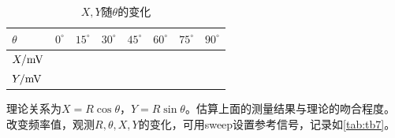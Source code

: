 \documentclass[11pt,a4paper]{ctexart}
\begin{document}
\begin{table}[H]
\centering

\begin{tabular}{|p{15mm}|p{15mm}|p{15mm}|p{15mm}|p{15mm}|p{15mm}|p{15mm}|p{15mm}|}
\hline
$\theta$ & $0^\circ$ & $15^\circ$ & $30^\circ$ & $45^\circ$ & $60^\circ$ & $75^\circ$ & $90^\circ$ \\ \hline
$X/{\rm mV}$ &  &  &  &  &  &  &  \\ \hline
$Y/{\rm mV}$ &  &  &  &  &  &  &  \\ \hline
\end{tabular}

\caption{$X,Y$随$\theta$的变化\label{tab:tb6}}
\end{table}
理论关系为$X= R\cos \theta$，$Y = R\sin \theta$。估算上面的测量结果与理论的吻合程度\uline{\hspace{4cm}}。改变频率值，观测$R,\theta ,X,Y$的变化，可用sweep设置参考信号，记录如\cref{tab:tb7}。
\end{document}
